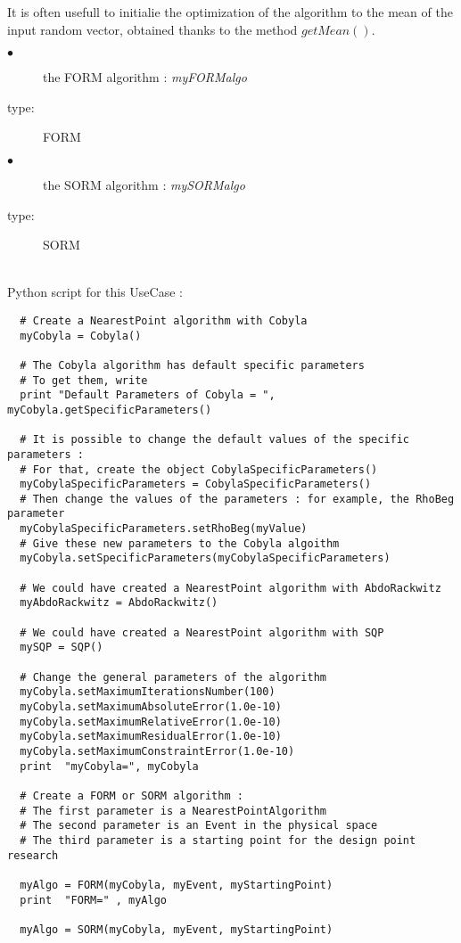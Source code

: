 It is often usefull to initialie the optimization of the algorithm to the mean of the input random vector, obtained thanks to the method $getMean()$.\\


{
  \begin{description}
  \item[$\bullet$] the FORM algorithm : {\itshape myFORMalgo}
  \item[type:] FORM
  \item[$\bullet$] the SORM algorithm : {\itshape mySORMalgo}
  \item[type:] SORM
  \end{description}
}

\textspace\\
Python  script for this UseCase :

\begin{lstlisting}
  # Create a NearestPoint algorithm with Cobyla
  myCobyla = Cobyla()

  # The Cobyla algorithm has default specific parameters
  # To get them, write
  print "Default Parameters of Cobyla = ", myCobyla.getSpecificParameters()

  # It is possible to change the default values of the specific parameters :
  # For that, create the object CobylaSpecificParameters()
  myCobylaSpecificParameters = CobylaSpecificParameters()
  # Then change the values of the parameters : for example, the RhoBeg parameter
  myCobylaSpecificParameters.setRhoBeg(myValue)
  # Give these new parameters to the Cobyla algoithm
  myCobyla.setSpecificParameters(myCobylaSpecificParameters)

  # We could have created a NearestPoint algorithm with AbdoRackwitz
  myAbdoRackwitz = AbdoRackwitz()

  # We could have created a NearestPoint algorithm with SQP
  mySQP = SQP()

  # Change the general parameters of the algorithm
  myCobyla.setMaximumIterationsNumber(100)
  myCobyla.setMaximumAbsoluteError(1.0e-10)
  myCobyla.setMaximumRelativeError(1.0e-10)
  myCobyla.setMaximumResidualError(1.0e-10)
  myCobyla.setMaximumConstraintError(1.0e-10)
  print  "myCobyla=", myCobyla

  # Create a FORM or SORM algorithm :
  # The first parameter is a NearestPointAlgorithm
  # The second parameter is an Event in the physical space
  # The third parameter is a starting point for the design point research

  myAlgo = FORM(myCobyla, myEvent, myStartingPoint)
  print  "FORM=" , myAlgo

  myAlgo = SORM(myCobyla, myEvent, myStartingPoint)
\end{lstlisting}
